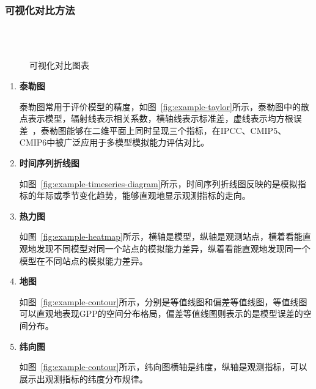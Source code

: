 \subsubsection{可视化对比方法}
\begin{figure}[!htbp]
    \centering
    \hfill
     \\
     \\
    \hfill
    \caption{可视化对比图表}
    \label{fig:ms-server-microservice}
\end{figure}
\begin{enumerate}[(1)]
\item \textbf{泰勒图}

泰勒图常用于评价模型的精度，如图~\ref{fig:example-taylor}所示，泰勒图中的散点表示模型，辐射线表示相关系数，横轴线表示标准差，虚线表示均方根误差~\cite{taylor2001summarizing}，泰勒图能够在二维平面上同时呈现三个指标，在IPCC、CMIP5、CMIP6中被广泛应用于多模型模拟能力评估对比。

\item \textbf{时间序列折线图}

如图~\ref{fig:example-timeseries-diagram}所示，时间序列折线图反映的是模拟指标的年际或季节变化趋势，能够直观地显示观测指标的走向。

\item \textbf{热力图}

如图~\ref{fig:example-heatmap}所示，横轴是模型，纵轴是观测站点，横着看能直观地发现不同模型对同一个站点的模拟能力差异，纵着看能直观地发现同一个模型在不同站点的模拟能力差异。

\item \textbf{地图}

如图~\ref{fig:example-contour}所示，分别是等值线图和偏差等值线图，等值线图可以直观地表现GPP的空间分布格局，偏差等值线图则表示的是模型误差的空间分布。

\item \textbf{纬向图}

如图~\ref{fig:example-contour}所示，纬向图横轴是纬度，纵轴是观测指标，可以展示出观测指标的纬度分布规律。

\end{enumerate}

